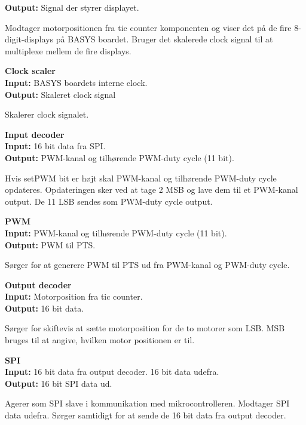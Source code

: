 \textbf{Output:} Signal der styrer displayet.

Modtager motorpositionen fra tic counter komponenten og viser det på de fire 8-digit-displays 
på BASYS boardet. Bruger det skalerede clock signal til at multiplexe mellem de 
fire displays.

\textbf{Clock scaler}\\
\textbf{Input:} BASYS boardets interne clock.\\
\textbf{Output:} Skaleret clock signal

Skalerer clock signalet.

\textbf{Input decoder}\\
\textbf{Input:} 16 bit data fra SPI.\\
\textbf{Output:} PWM-kanal og tilhørende PWM-duty cycle (11 bit).

Hvis setPWM bit er højt skal PWM-kanal og tilhørende PWM-duty cycle opdateres.
Opdateringen sker ved at tage 2 MSB og lave dem til et PWM-kanal output. De 11 
LSB sendes som PWM-duty cycle output.

\textbf{PWM}\\
\textbf{Input:} PWM-kanal og tilhørende PWM-duty cycle (11 bit).\\
\textbf{Output:} PWM til PTS.

Sørger for at generere PWM til PTS ud fra PWM-kanal og PWM-duty cycle.

\textbf{Output decoder}\\
\textbf{Input:} Motorposition fra tic counter.\\
\textbf{Output:} 16 bit data.

Sørger for skiftevis at sætte motorposition for de to motorer som LSB.
MSB bruges til at angive, hvilken motor positionen er til.

\textbf{SPI}\\
\textbf{Input:} 16 bit data fra output decoder. 16 bit data udefra.\\
\textbf{Output:} 16 bit SPI data ud.

Agerer som SPI slave i kommunikation med mikrocontrolleren.
Modtager SPI data udefra. Sørger samtidigt for at sende de 16 bit data fra output decoder.


